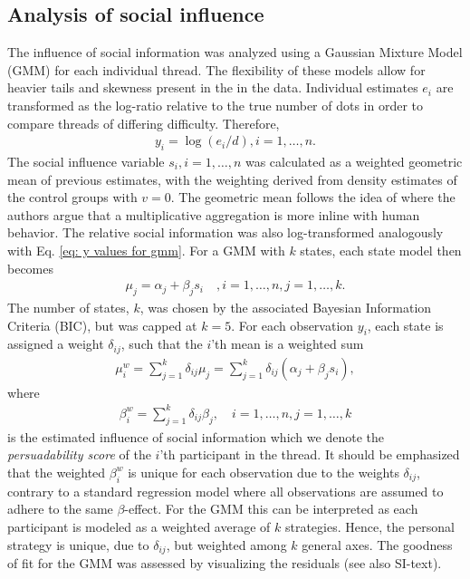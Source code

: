 \documentclass[9pt,twocolumn,twoside,lineno]{pnas-new}
\begin{document}
{\subsection*{Analysis of social influence}
The influence of social information was analyzed using a Gaussian Mixture Model (GMM) for each individual thread. The flexibility of these models allow for heavier tails and skewness present in the in the data. Individual estimates $e_i$ are transformed as the log-ratio relative to the true number of dots in order to compare threads of differing difficulty. Therefore, 
\begin{align}
	y_i = \log(e_i/d), i=1,\dots,n. \label{eq: y values for gmm}
\end{align}
The social influence variable $s_i, i=1,\dots, n$ was calculated as a weighted geometric mean of previous estimates, with the weighting derived from density estimates of the control groups with $v=0$. The geometric mean follows the idea of \citep{jayles2017social} where the authors argue that a multiplicative aggregation is more inline with human behavior. The relative social information was also log-transformed analogously with Eq. \ref{eq: y values for gmm}.  For a GMM with $k$ states, each state model then becomes
\begin{align}
	\mu_j = \alpha_j+\beta_j s_i \quad, i=1,\dots,n, j=1, \dots,k. \label{eq: mean models}
\end{align}
The number of states, $k$, was chosen by the associated Bayesian Information Criteria (BIC), but was capped at $k=5$. For each observation $y_i$, each state is assigned a weight $\delta_{ij}$, such that the $i$'th mean is a weighted sum
\begin{align}
	\mu^w_i = \sum_{j=1}^k\delta_{ij}\mu_j = \sum_{j=1}^k\delta_{ij}(\alpha_j +\beta_j s_i),
\end{align}
where 
\begin{align}
	\beta^w_i = \sum_{j=1}^k \delta_{ij}\beta_j, \quad i=1,\dots, n, j=1,\dots,k \label{eq: weighted beta}
\end{align}
is the estimated influence of social information which we denote the \emph{persuadability score} of the $i$'th participant in the thread. It should be emphasized that the weighted $\beta^w_i$ is unique for each observation due to the weights $\delta_{ij}$, contrary to a standard regression model where all observations are assumed to adhere to the same $\beta$-effect. For the GMM this can be interpreted as each participant is modeled as a weighted average of $k$ strategies. Hence, the personal strategy is unique, due to $\delta_{ij}$, but weighted among $k$ general axes. The goodness of fit for the GMM was assessed by visualizing the residuals (see also SI-text). 
}
\showmatmethods{} %
\end{document}
